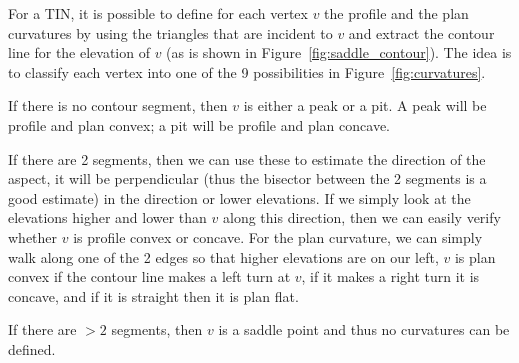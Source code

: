 For a TIN, it is possible to define for each vertex $v$ the profile and the plan curvatures by using the triangles that are incident to $v$ and extract the contour line for the elevation of $v$ (as is shown in Figure~\ref{fig:saddle_contour}).
The idea is to classify each vertex into one of the 9 possibilities in Figure~\ref{fig:curvatures}.

If there is no contour segment, then $v$ is either a peak or a pit.
A peak will be profile and plan convex; a pit will be profile and plan concave.

If there are 2 segments, then we can use these to estimate the direction of the aspect, it will be perpendicular (thus the bisector between the 2 segments is a good estimate) in the direction or lower elevations.
If we simply look at the elevations higher and lower than $v$ along this direction, then we can easily verify whether $v$ is profile convex or concave.
For the plan curvature, we can simply walk along one of the 2 edges so that higher elevations are on our left, $v$ is plan convex if the contour line makes a left turn at $v$, if it makes a right turn it is concave, and if it is straight then it is plan flat.

If there are $>2$ segments, then $v$ is a saddle point and thus no curvatures can be defined.

%


